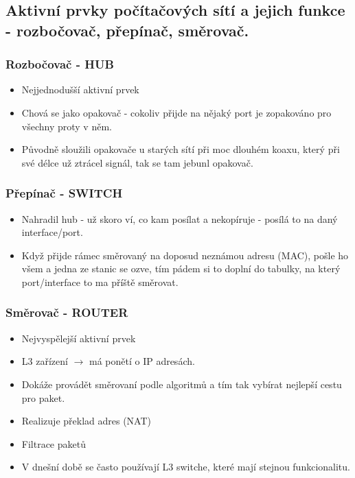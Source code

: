 \documentclass[10pt,a4paper]{article}
\begin{document}
\subsection{Aktivní prvky počítačových sítí a jejich funkce - rozbočovač, přepínač, směrovač.}
\subsubsection{Rozbočovač - HUB}

\begin{itemize}
\item Nejjednodušší aktivní prvek
\item Chová se jako opakovač - cokoliv přijde na nějaký port je zopakováno pro všechny proty v něm.
\item Původně sloužili opakovače u starých sítí při moc dlouhém koaxu, který při své délce už ztrácel signál, tak se tam jebunl opakovač.
\end{itemize}
\subsubsection{Přepínač - SWITCH}

\begin{itemize}
\item Nahradil hub - už skoro ví, co kam posílat a nekopíruje - posílá to na daný interface/port.
\item Když přijde rámec směrovaný na doposud neznámou adresu (MAC), pošle ho všem a jedna ze stanic se ozve, tím pádem si to doplní do tabulky, na který port/interface to ma příště směrovat.
\end{itemize}
\subsubsection{Směrovač - ROUTER}

\begin{itemize}
\item Nejvyspělejší aktivní prvek
\item L3 zařízení $\rightarrow$ má ponětí o IP adresách.
\item Dokáže provádět směrovaní podle algoritmů a tím tak vybírat nejlepší cestu pro paket.
\item Realizuje překlad adres (NAT)
\item Filtrace paketů
\item V dnešní době se často používají L3 switche, které mají stejnou funkcionalitu.
\end{itemize}
\end{document}

